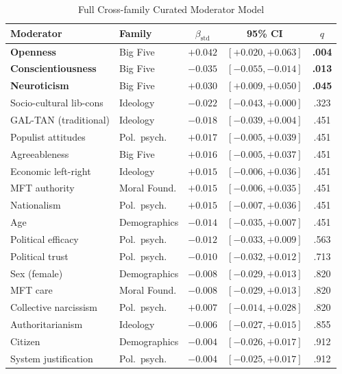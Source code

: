 \documentclass[11pt,a4paper]{article}
\newcommand{\floatleft}{\setlength{\parindent}{0pt}\RaggedRight}
\begin{document}
\begin{table}[H]
\floatleft
\caption{Full Cross-family Curated Moderator Model}
\label{tab:curatedfull}
\vspace{2pt}
\begingroup\small
\begin{tabularx}{\linewidth}{@{}Yp{2.1cm}ccc@{}}
\toprule
Moderator & Family & $\beta_{\text{std}}$ & 95\% CI & $q$ \\
\midrule
\textbf{Openness} & Big Five & $\mathbf{+0.042}$ & $[+0.020, +0.063]$ & \textbf{.004} \\
\textbf{Conscientiousness} & Big Five & $\mathbf{-0.035}$ & $[-0.055, -0.014]$ & \textbf{.013} \\
\textbf{Neuroticism} & Big Five & $\mathbf{+0.030}$ & $[+0.009, +0.050]$ & \textbf{.045} \\
Socio-cultural lib-cons & Ideology & $-0.022$ & $[-0.043, +0.000]$ & .323 \\
GAL-TAN (traditional) & Ideology & $-0.018$ & $[-0.039, +0.004]$ & .451 \\
Populist attitudes & Pol.\ psych. & $+0.017$ & $[-0.005, +0.039]$ & .451 \\
Agreeableness & Big Five & $+0.016$ & $[-0.005, +0.037]$ & .451 \\
Economic left-right & Ideology & $+0.015$ & $[-0.006, +0.036]$ & .451 \\
MFT authority & Moral Found. & $+0.015$ & $[-0.006, +0.035]$ & .451 \\
Nationalism & Pol.\ psych. & $+0.015$ & $[-0.007, +0.036]$ & .451 \\
Age & Demographics & $-0.014$ & $[-0.035, +0.007]$ & .451 \\
Political efficacy & Pol.\ psych. & $-0.012$ & $[-0.033, +0.009]$ & .563 \\
Political trust & Pol.\ psych. & $-0.010$ & $[-0.032, +0.012]$ & .713 \\
Sex (female) & Demographics & $-0.008$ & $[-0.029, +0.013]$ & .820 \\
MFT care & Moral Found. & $-0.008$ & $[-0.029, +0.013]$ & .820 \\
Collective narcissism & Pol.\ psych. & $+0.007$ & $[-0.014, +0.028]$ & .820 \\
Authoritarianism & Ideology & $-0.006$ & $[-0.027, +0.015]$ & .855 \\
Citizen & Demographics & $-0.004$ & $[-0.026, +0.017]$ & .912 \\
System justification & Pol.\ psych. & $-0.004$ & $[-0.025, +0.017]$ & .912 \\

\end{tabularx}
\end{table}
\end{document}
